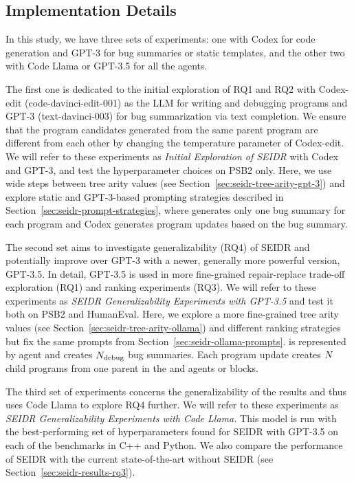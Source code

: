 \newpage \subsection{Implementation Details}
\label{sec:seidr-implementation}


In this study, we have three sets of experiments: one with Codex for code generation and GPT-3 for bug summaries or static templates, and the other two with Code Llama or GPT-3.5 for all the agents. 

The first one is dedicated to the initial exploration of RQ1 and RQ2 with Codex-edit (code-davinci-edit-001) as the LLM for writing and debugging programs and GPT-3 (text-davinci-003) for bug summarization via text completion. 
We ensure that the program candidates generated from the same parent program are different from each other by changing the temperature parameter of Codex-edit.
We will refer to these experiments as \emph{Initial Exploration of SEIDR} with Codex and GPT-3, and test the hyperparameter choices on PSB2 only.
Here, we use wide steps between tree arity values (see Section~\ref{sec:seidr-tree-arity-gpt-3}) and explore static and GPT-3-based prompting strategies described in Section~\ref{sec:seidr-prompt-strategies}, where \synthmodel{} generates only one bug summary for each program and Codex generates \treearity{} program updates based on the bug summary.
 
The second set aims to investigate generalizability (RQ4) of SEIDR and potentially improve over GPT-3 with a newer, generally more powerful version, GPT-3.5.
In detail, GPT-3.5 is used in more fine-grained repair-replace trade-off exploration (RQ1) and ranking experiments (RQ3). 
We will refer to these experiments as \emph{SEIDR Generalizability  Experiments with  GPT-3.5} and test it both on PSB2 and HumanEval.
Here, we explore a more fine-grained tree arity values (see Section~\ref{sec:seidr-tree-arity-ollama}) and different ranking strategies but fix the same prompts from Section~\ref{sec:seidr-ollama-prompts}. 
\instruct{} is represented by \instructllm{} agent and creates $N_\text{debug}{}$ bug summaries.
Each program update creates $N{}$ child programs from one parent in the \synthesize{} and \debug{} agents or blocks.

The third set of experiments concerns the generalizability of the results and thus uses Code Llama to explore RQ4 further. 
We will refer to these experiments as \emph{SEIDR Generalizability Experiments with Code Llama.}
This model is run with the best-performing set of hyperparameters found for SEIDR with GPT-3.5 on each of the benchmarks in C++ and Python.
We also compare the performance of SEIDR with the current state-of-the-art without SEIDR (see Section~\ref{sec:seidr-results-rq3}).


